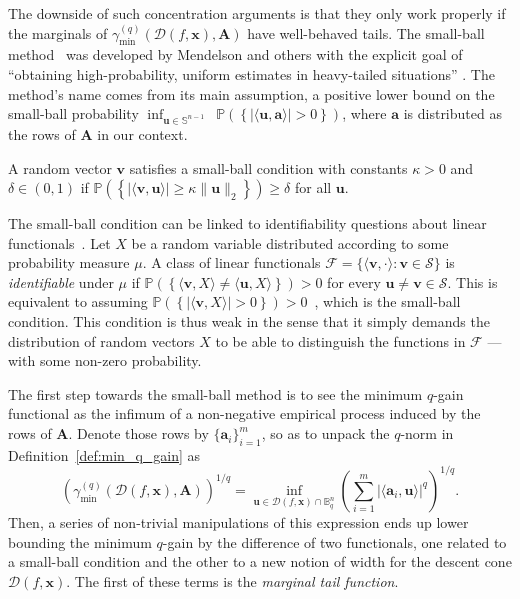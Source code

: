 The downside of such concentration arguments is that they only work properly if the marginals of $\gamma_{\min}^{(q)} \left ( \mathcal{D}( f, \mathbf{x}), \mathbf{A} \right )$ have well-behaved tails. The small-ball method~\cite{mendelson2015, koltchinskii2015} was developed by Mendelson and others with the explicit goal of ``obtaining high-probability, uniform estimates in heavy-tailed situations'' \cite[p. 7]{mendelson2018}. The method's name comes from its main assumption, a positive lower bound on the small-ball probability $\inf_{\mathbf{u} \in \mathbb{S}^{n-1}} \enspace \mathbb{P} \left ( \left \{ |\langle \mathbf{u}, \mathbf{a} \rangle| > 0\right \}\right )$, where $\mathbf{a}$ is distributed as the rows of $\mathbf{A}$ in our context.

\begin{definition}\label{def:small-ball-condition}
    A random vector $\mathbf{v}$ satisfies a small-ball condition with constants $\kappa > 0$ and $\delta \in  (0,1)$ if $\mathbb{P} \left ( \left \{  |\langle \mathbf{v}, \mathbf{u} \rangle| \geq \kappa \| \mathbf{u} \|_2 \right \}\right ) \geq \delta$ for all $\mathbf{u}$.
\end{definition}

The small-ball condition can be linked to identifiability questions about linear functionals~\cite{lecue2018, lecue2017a}. Let $X$ be a random variable distributed according to some probability measure $\mu$. A class of linear functionals $\mathcal{F} = \{ \langle \mathbf{v}, \cdot \rangle : \mathbf{v} \in \mathcal{S}\}$ is \emph{identifiable} under $\mu$ if $\mathbb{P} \left ( \left \{ \langle \mathbf{v}, X \rangle \neq \langle \mathbf{u}, X \rangle \right \}\right ) > 0$ for every $\mathbf{u} \neq \mathbf{v} \in \mathcal{S}$. This is equivalent to assuming $\mathbb{P} \left ( \left \{ |\langle \mathbf{v}, X \rangle| > 0\right \}\right ) > 0$~\cite{lecue2018, lecue2017a}, which is the small-ball condition. This condition is thus weak in the sense that it simply demands the distribution of random vectors $X$ to be able to distinguish the functions in $\mathcal{F}$ --- with some non-zero probability.

The first step towards the small-ball method is to see the minimum $q$-gain functional as the infimum of a non-negative empirical process induced by the rows of $\mathbf{A}$. Denote those rows by $\{ \mathbf{a}_i \}_{i=1}^m$, so as to unpack the $q$-norm in Definition~\ref{def:min_q_gain} as
\begin{equation}
    \left ( \gamma_{\min}^{(q)} \left ( \mathcal{D}( f, \mathbf{x}), \mathbf{A} \right ) \right )^{1/q} = \underset{\mathbf{u} \in \mathcal{D}(f, \mathbf{x}) \cap \mathbb{B}^{n}_q}{\inf} \left ( \sum_{i=1}^{m} | \langle \mathbf{a}_i, \mathbf{u} \rangle |^q \right )^{1/q}.
\end{equation}
Then, a series of non-trivial manipulations of this expression ends up lower bounding the minimum $q$-gain by the difference of two functionals, one related to a small-ball condition and the other to a new notion of width for the descent cone $\mathcal{D}( f, \mathbf{x})$. The first of these terms is the \emph{marginal tail function}.

